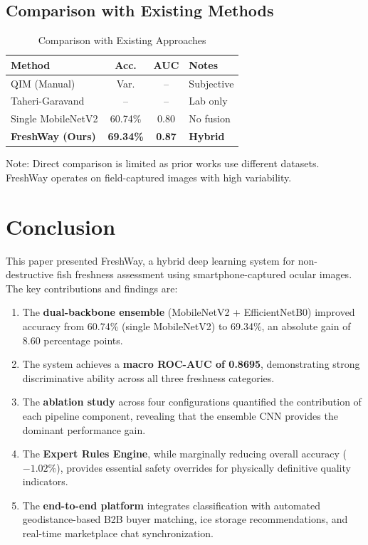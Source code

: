 \documentclass[conference]{IEEEtran}
\begin{document}
\subsection{Comparison with Existing Methods}

\begin{table}[h]
\centering
\caption{Comparison with Existing Approaches}
\label{tab:comparison}
\begin{tabular}{lccl}
\toprule
\textbf{Method} & \textbf{Acc.} & \textbf{AUC} & \textbf{Notes} \\
\midrule
QIM (Manual) & Var. & -- & Subjective \\
Taheri-Garavand~\cite{ref24} & -- & -- & Lab only \\
Single MobileNetV2 & 60.74\% & 0.80 & No fusion \\
\textbf{FreshWay (Ours)} & \textbf{69.34\%} & \textbf{0.87} & \textbf{Hybrid} \\
\bottomrule
\end{tabular}
\vspace{0.1cm}

\scriptsize{Note: Direct comparison is limited as prior works use different datasets. FreshWay operates on field-captured images with high variability.}
\end{table}

\section{Conclusion}

This paper presented FreshWay, a hybrid deep learning system for non-destructive fish freshness assessment using smartphone-captured ocular images. The key contributions and findings are:

\begin{enumerate}[leftmargin=*]
    \item The \textbf{dual-backbone ensemble} (MobileNetV2 + EfficientNetB0) improved accuracy from 60.74\% (single MobileNetV2) to 69.34\%, an absolute gain of 8.60 percentage points.
    \item The system achieves a \textbf{macro ROC-AUC of 0.8695}, demonstrating strong discriminative ability across all three freshness categories.
    \item The \textbf{ablation study} across four configurations quantified the contribution of each pipeline component, revealing that the ensemble CNN provides the dominant performance gain.
    \item The \textbf{Expert Rules Engine}, while marginally reducing overall accuracy ($-1.02\%$), provides essential safety overrides for physically definitive quality indicators.
    \item The \textbf{end-to-end platform} integrates classification with automated geodistance-based B2B buyer matching, ice storage recommendations, and real-time marketplace chat synchronization.
\end{enumerate}
\end{document}
